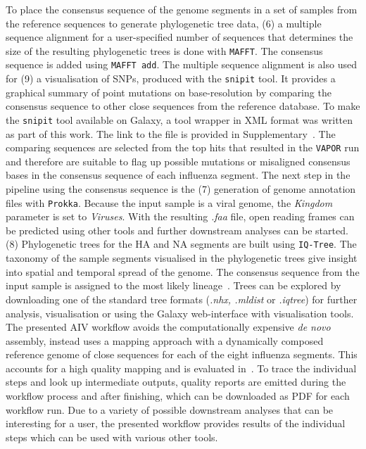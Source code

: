 To place the consensus sequence of the genome segments in a set of samples from the reference sequences to generate phylogenetic tree data, (6) a multiple sequence alignment for a user-specified number of sequences that determines the size of the resulting phylogenetic trees is done with \texttt{\acs{MAFFT}}. The consensus sequence is added using \texttt{\acs{MAFFT} add}. The multiple sequence alignment is also used for (9) a visualisation of \acp{SNP}, produced with the \texttt{snipit} tool. It provides a graphical summary of point mutations on base-resolution by comparing the consensus sequence to other close sequences from the reference database. To make the \texttt{snipit} tool available on Galaxy, a tool wrapper in XML format was written as part of this work. The link to the file is provided in Supplementary~. The comparing sequences are selected from the top hits that resulted in the \texttt{VAPOR} run and therefore are suitable to flag up possible mutations or misaligned consensus bases in the consensus sequence of each influenza segment. The next step in the pipeline using the consensus sequence is the (7) generation of genome annotation files with \texttt{Prokka}. Because the input sample is a viral genome, the \textit{Kingdom} parameter is set to \textit{Viruses}. With the resulting \textit{.faa} file, open reading frames can be predicted using other tools and further downstream analyses can be started. (8) Phylogenetic trees for the \ac{HA} and \ac{NA} segments are built using \texttt{IQ-Tree}. The taxonomy of the sample segments visualised in the phylogenetic trees give insight into spatial and temporal spread of the genome. The consensus sequence from the input sample is assigned to the most likely lineage~\cite{minh2020iq}. Trees can be explored by downloading one of the standard tree formats (\textit{.nhx, .mldist} or \textit{.iqtree}) for further analysis, visualisation or using the Galaxy web-interface with visualisation tools. \\
The presented \ac{AIV} workflow avoids the computationally expensive \textit{de novo} assembly, instead uses a mapping approach with a dynamically composed reference genome of close sequences for each of the eight influenza segments. This accounts for a high quality mapping and is evaluated in~. To trace the individual steps and look up intermediate outputs, quality reports are emitted during the workflow process and after finishing, which can be downloaded as PDF for each workflow run. Due to a variety of possible downstream analyses that can be interesting for a user, the presented workflow provides results of the individual steps which can be used with various other tools.

